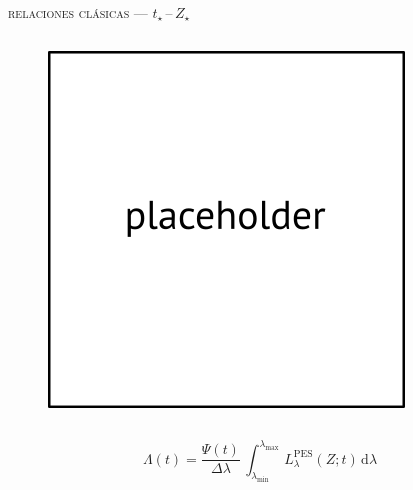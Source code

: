 \documentclass[xcolor=dvipsnames,4pt,hyperref={colorlinks,citecolor=black,linkcolor=black,urlcolor=black}]{beamer}
\begin{document}
\begin{frame}{\textsc{relaciones clásicas --- $t_\star\,$--$\,Z_\star$}}
\begin{columns}
%
\begin{figure}
\includegraphics[scale=1]{img/placeholder}
\end{figure}
\end{columns}

$$\Lambda(t) = \frac{\Psi(t)}{\Delta\lambda}\,\int_{\lambda_\text{min}}^{\lambda_\text{max}}\,L_\lambda^\text{PES}(Z;t)\,\text{d}\lambda$$

\end{frame}
\end{document}
